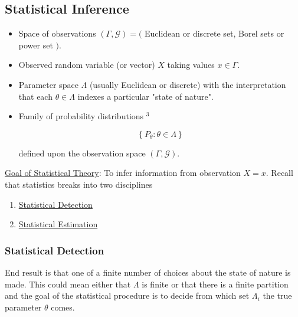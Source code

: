 \documentclass[12pt,thmsa]{article}
\begin{document}
\subsection{Statistical Inference}
\begin{itemize}
	\item Space of observations $(\Gamma, \mathcal{G})=($ Euclidean or discrete set, Borel sets or power set $)$.
	\item Observed random variable (or vector) $X$ taking values $x \in \Gamma$.
	\item Parameter space $\Lambda$ (usually Euclidean or discrete) with the interpretation that each $\theta \in \Lambda$ indexes a particular "state of nature".
	\item Family of probability distributions ${ }^{3}$

	$$
	\left\{P_{\theta}: \theta \in \Lambda\right\}
	$$
	
	defined upon the observation space $(\Gamma, \mathcal{G})$.

\end{itemize}

\noindent
\underline{Goal of Statistical Theory}: To infer information from observation $X=x$. Recall that statistics breaks into two disciplines

\begin{enumerate}
	\item \underline{Statistical Detection}
	
	\item \underline{Statistical Estimation}
	
\end{enumerate}

\subsubsection{Statistical Detection}
End result is that one of a finite number of choices about the state of nature is made. This could mean either that $\Lambda$ is finite or that there is a finite partition 
and the goal of the statistical procedure is to decide from which set $\Lambda_{i}$ the true parameter $\theta$ comes.
\end{document}
